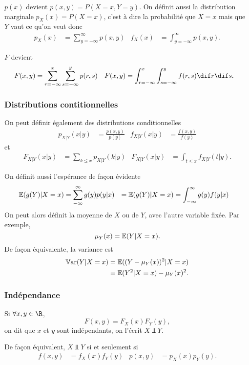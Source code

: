 $p(x)$ devient $p(x, y) = P(X = x, Y = y)$.
On définit aussi la distribution marginale $p_X(x) = P(X = x)$,
c'est à dire la probabilité que $X = x$ mais que $Y$ vaut ce qu'on veut
donc
\begin{align*}
  p_X(x) & = \sum_{y = -\infty}^{\infty} p(x, y) & f_X(x) & = \int_{y = -\infty}^{\infty} p(x, y).
\end{align*}

$F$ devient
\begin{align*}
  F(x, y) & = \sum_{r = -\infty}^{x} \sum_{s = -\infty}^{y} p(r, s) & F(x, y) & = \int_{r=-\infty}^{x} \int_{s=-\infty}^{y} f(r, s) \dif r \dif s.
\end{align*}

\subsubsection{Distributions contitionnelles}
On peut définir également des distributions conditionnelles
\begin{align*}
  p_{X|Y}(x|y) & = \frac{p(x, y)}{p(y)} & f_{X|Y}(x|y) & = \frac{f(x,y)}{f(y)}
\end{align*}
et
\begin{align*}
  F_{X|Y}(x|y) & = \sum_{k \leq x} p_{X|Y}(k|y) & F_{X|Y}(x|y) & = \int_{t \leq x} f_{X|Y}(t|y).
\end{align*}

On définit aussi l'espérance de façon évidente
\begin{align*}
  \mathbb{E}(g(Y)|X=x) & = \sum_{-\infty}^\infty g(y) p(y|x) & = \mathbb{E}(g(Y)|X=x) & = \int_{-\infty}^\infty g(y) f(y|x)
\end{align*}
On peut alors définit la moyenne de $X$ ou de $Y$, avec l'autre variable fixée. Par exemple,
\[ \mu_Y(x) = \mathbb{E}(Y | X = x). \]
De façon équivalente, la variance est
\begin{align*}
  \operatorname{\mathbb{V}ar}(Y|X=x) & = \mathbb{E}((Y - \mu_Y(x))^2 | X = x)\\
              & = \mathbb{E}(Y^2|X = x) - \mu_Y(x)^2.
\end{align*}

\subsubsection{Indépendance}
Si $\forall x, y \in \R$,
\[ F(x, y) = F_X(x) F_Y(y), \]
on dit que $x$ et $y$ sont indépendants, on l'écrit $X \Perp Y$.

De façon équivalent, $X \Perp Y$ si et seulement si
\begin{align*}
  f(x, y) & = f_X(x) f_Y(y) & p(x, y) & = p_X(x) p_Y(y).
\end{align*}

